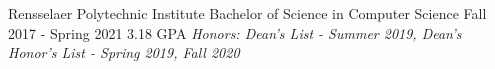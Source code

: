 \begin{cventries}
  \education
    {Rensselaer Polytechnic Institute}
    {Bachelor of Science in Computer Science}
    {Fall 2017 - Spring 2021}
    {3.18 GPA}
    {\textit{Honors: Dean's List - Summer 2019, Dean's Honor's List - Spring 2019, Fall 2020}}
\end{cventries}